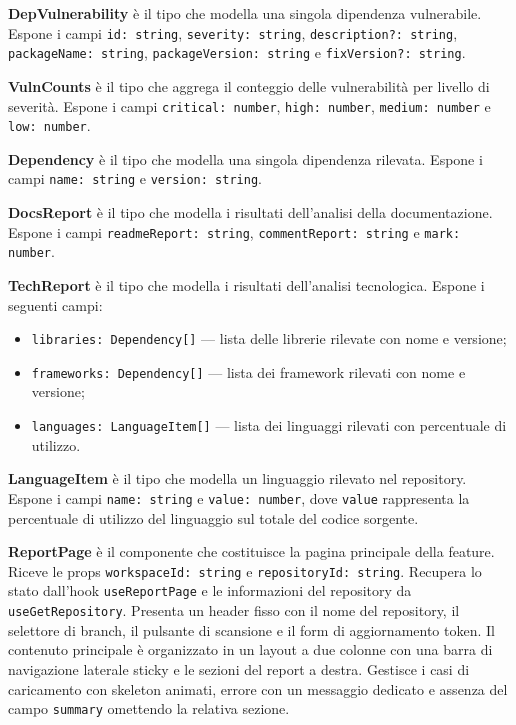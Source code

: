 \documentclass[a4paper, 11pt]{article}
\newcounter{subsubsubsection}[subsubsection]
\newcounter{subsubsubsubsection}[subsubsubsection]
\begin{document}
\textbf{DepVulnerability} è il tipo che modella una singola dipendenza vulnerabile. Espone i
campi \texttt{id: string}, \texttt{severity: string}, \texttt{description?: string},
\texttt{packageName: string}, \texttt{packageVersion: string} e \texttt{fixVersion?: string}.

\textbf{VulnCounts} è il tipo che aggrega il conteggio delle vulnerabilità per livello di
severità. Espone i campi \texttt{critical: number}, \texttt{high: number},
\texttt{medium: number} e \texttt{low: number}.

\textbf{Dependency} è il tipo che modella una singola dipendenza rilevata. Espone i campi
\texttt{name: string} e \texttt{version: string}.

\textbf{DocsReport} è il tipo che modella i risultati dell'analisi della documentazione. Espone
i campi \texttt{readmeReport: string}, \texttt{commentReport: string} e \texttt{mark: number}.

\textbf{TechReport} è il tipo che modella i risultati dell'analisi tecnologica. Espone i
seguenti campi:
\begin{itemize}
  \item \texttt{libraries: Dependency[]} — lista delle librerie rilevate con nome e versione;
  \item \texttt{frameworks: Dependency[]} — lista dei framework rilevati con nome e versione;
  \item \texttt{languages: LanguageItem[]} — lista dei linguaggi rilevati con percentuale di
        utilizzo.
\end{itemize}

\textbf{LanguageItem} è il tipo che modella un linguaggio rilevato nel repository. Espone i
campi \texttt{name: string} e \texttt{value: number}, dove \texttt{value} rappresenta la
percentuale di utilizzo del linguaggio sul totale del codice sorgente.


\textbf{ReportPage} è il componente che costituisce la pagina principale della feature. Riceve
le props \texttt{workspaceId: string} e \texttt{repositoryId: string}. Recupera lo stato
dall'hook \texttt{useReportPage} e le informazioni del repository da \texttt{useGetRepository}.
Presenta un header fisso con il nome del repository, il selettore di branch, il pulsante di
scansione e il form di aggiornamento token. Il contenuto principale è organizzato in un layout
a due colonne con una barra di navigazione laterale sticky e le sezioni del report a destra.
Gestisce i casi di caricamento con skeleton animati, errore con un messaggio dedicato e
assenza del campo \texttt{summary} omettendo la relativa sezione.
\end{document}

